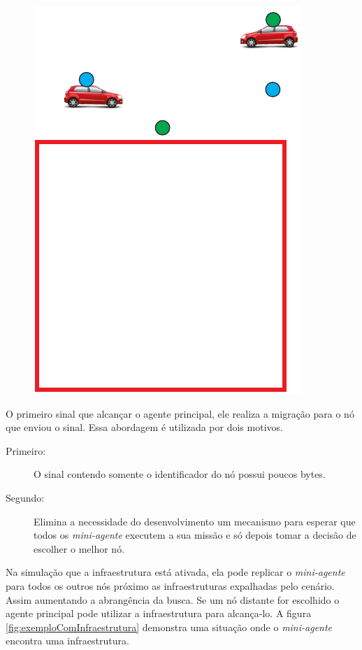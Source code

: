 \begin{figure}[htbp]
\begin{minipage}{0.33\textwidth}
		\label{fig:destinoVeiculoSelecionadoDentroRA}
	\end{minipage}
	\begin{minipage}{0.33\textwidth}
		\centering
		\includegraphics[scale=0.5]{metodologia/figuras/destinoVeiculoSelecionadoProximoRA.pdf}
		\label{fig:destinoVeiculoSelecionadoProximoRA}
	\end{minipage}
\end{figure}

O primeiro sinal que alcançar o agente principal, ele realiza a migração para o nó que enviou o sinal. Essa abordagem é utilizada por dois motivos.

\begin{description}
	\item[Primeiro:] O sinal contendo somente o identificador do nó possui poucos bytes.
	\item[Segundo:] Elimina a necessidade do desenvolvimento um mecanismo para esperar que todos os \emph{mini-agente} executem a sua missão e só depois tomar a decisão de escolher o melhor nó.
\end{description}

Na simulação que a infraestrutura está ativada, ela pode replicar o \emph{mini-agente} para todos os outros nós próximo as infraestruturas expalhadas pelo cenário. Assim aumentando a abrangência da busca. Se um nó distante for escolhido o agente principal pode utilizar a infraestrutura para alcança-lo. A figura \ref{fig:exemploComInfraestrutura} demonstra uma situação onde o \emph{mini-agente} encontra uma infraestrutura.

